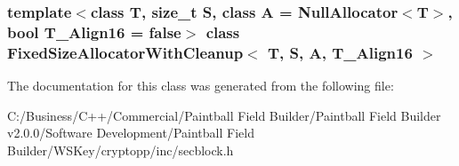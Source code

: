 \subsubsection*{template$<$class T, size\_\-t S, class A = NullAllocator$<$T$>$, bool T\_\-Align16 = false$>$ class FixedSizeAllocatorWithCleanup$<$ T, S, A, T\_\-Align16 $>$}



The documentation for this class was generated from the following file:\begin{DoxyCompactItemize}
\item 
C:/Business/C++/Commercial/Paintball Field Builder/Paintball Field Builder v2.0.0/Software Development/Paintball Field Builder/WSKey/cryptopp/inc/secblock.h\end{DoxyCompactItemize}
